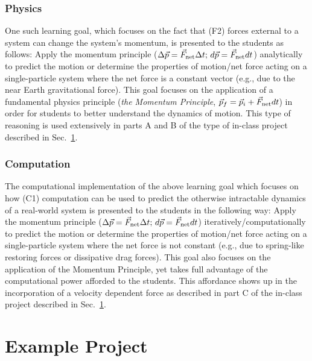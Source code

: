 \documentclass{msuphddissertation}
\begin{document}
\begin{doublespace}
\subsubsection{Physics}

One such learning goal, which focuses on the fact that (F2) forces external to a system can change the system's momentum, is presented to the students as follows: {\quote Apply the momentum principle ($\Delta\vec{p}=\vec{F}_{\rm net}\Delta t;\,d\vec{p}=\vec{F}_{\rm net}dt$) analytically to predict the motion or determine the properties of motion/net force acting on a single-particle system where the net force is a constant vector (e.g., due to the near Earth gravitational force).\endquote} \noindent This goal focuses on the application of a fundamental physics principle (\textit{the Momentum Principle}, $\vec{p}_f = \vec{p}_i + \vec{F}_{\rm net}dt$) in order for students to better understand the dynamics of motion.  This type of reasoning is used extensively in parts A and B of the type of in-class project described in Sec.~\ref{sec:example}.

\subsubsection{Computation}

The computational implementation of the above learning goal which focuses on how (C1) computation can be used to predict the otherwise intractable dynamics of a real-world system is presented to the students in the following way: {\quote Apply the momentum principle ($\Delta\vec{p}=\vec{F}_{\rm net}\Delta t;\,d\vec{p}=\vec{F}_{\rm net}dt$) iteratively/computationally to predict the motion or determine the properties of motion/net force acting on a single-particle system where the net force is not constant (e.g., due to spring-like restoring forces or dissipative drag forces).\endquote} \noindent This goal also focuses on the application of the Momentum Principle, yet takes full advantage of the computational power afforded to the students.  This affordance shows up in the incorporation of a velocity dependent force as described in part C of the in-class project described in Sec.~\ref{sec:example}.

%
%

\section{Example Project}\label{sec:example}


\end{doublespace}
\end{document}
